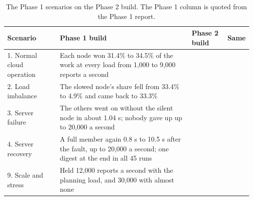 \begin{table}[!htb]
\centering\small
\caption{The Phase 1 scenarios on the Phase 2 build. The Phase 1 column is quoted from the Phase 1 report.}
\label{tab:regression}
\begin{tabularx}{\linewidth}{@{}P{2.4cm}LLp{1.1cm}@{}}
\toprule
Scenario & Phase 1 build \cite{phase1} & Phase 2 build & Same \\
. Normal cloud operation & Each node won 31.4\% to 34.5\% of the work at every load from 1,000 to 9,000 reports a second & \tbd{} & \tbd{} \\
2. Load imbalance & The slowed node's share fell from 33.4\% to 4.9\% and came back to 33.3\% & \tbd{} & \tbd{} \\
3. Server failure & The others went on without the silent node in about 1.04 s; nobody gave up up to 20,000 a second & \tbd{} & \tbd{} \\
4. Server recovery & A full member again 0.8 s to 10.5 s after the fault, up to 20,000 a second; one digest at the end in all 45 runs & \tbd{} & \tbd{} \\
9. Scale and stress & Held 12,000 reports a second with the planning load, and 30,000 with almost none & \tbd{} & \tbd{} \\
\bottomrule
\end{tabularx}
\end{table}
